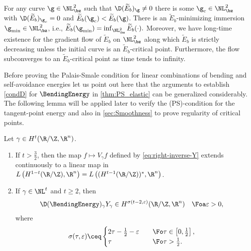 \begin{bcorollary}
\label{cor:elastic_crit_gradient-flow}
For any curve $\g\in\NL^2_{\bz}$ such that $\D(\widetilde{E}_b)_\g\not=0$ there is
some $\g_c\in\NL^2_{\bz}$ with $\D(\widetilde{E}_b)_{\g_c}=0$ and 
$\widetilde{E}_b(\g_c)<\widetilde{E}_b(\g)$. There is an 
$\widetilde{E}_b$-minimizing immersion
$\g_\textnormal{min}\in\NL^2_{\bz}$, i.e., $\widetilde{E}_b(\g_\textnormal{min})=
\inf_{\NL^2_{\bz}}\widetilde{E}_b(\cdot).$
Moreover, we have long-time existence for 
the gradient flow of $\widetilde{E}_b$ 
on $\NL^2_{\bz}$ along which $\widetilde{E}_b$ is strictly decreasing 
unless the initial curve is an
$\widetilde{E}_b$-critical point.
Furthermore, the flow subconverges to an $\widetilde{E}_b$-critical
point as time tends to infinity.
\end{bcorollary}
Before proving the Palais-Smale condition for linear combinations of bending and self-avoidance energies let us point out here that the arguments to establish \ref{condD} for $ \BendingEnergy $ in \cref{thm:PS_elastic} can be generalized considerably. The following lemma will be applied later to verify the (PS)-condition for the tangent-point energy and also in \cref{sec:Smoothness} to prove regularity of critical points. 
\begin{lemma}\label{lem:DEbYisLowerOrderIIII}
    Let $ \gamma\in H^{t}(\R/\Z,\R^n) $. 
    \begin{enumerate}
        \item[\textrm{(i)}] If $ t>\frac{3}{2} $, then the map $ f\mapsto V_{\gamma}f$ defined by \cref{eq:right-inverse-Y} extends continuously to a linear map in $ L\left( H^{1-t}(\R/\Z),\R^n \right)= L\left( (H^{t-1}(\R/\Z))^*,\R^n \right)$. 
        \item[\textrm{(ii)}] If $ \gamma\in \NL^{t} $ and $ t\ge 2 $, then 
        \begin{align*}
            \D(\BendingEnergy)_{\gamma}Y_\gamma\in H^{\sigma(t-2,\varepsilon)}(\R/\Z,\R^n)\quad \Foa \varepsilon>0,
        \end{align*}
        where 
        \begin{align*}
            \sigma(\tau,\varepsilon)\ceq 
            \begin{cases}
                2\tau-\frac{1}{2}-\varepsilon &\quad\Fo \tau\in \left[0,\frac{1}{2}\right],\\
                \tau &\quad \Fo\tau>\frac{1}{2}.
            \end{cases}
        \end{align*}
    \end{enumerate}
\end{lemma}

